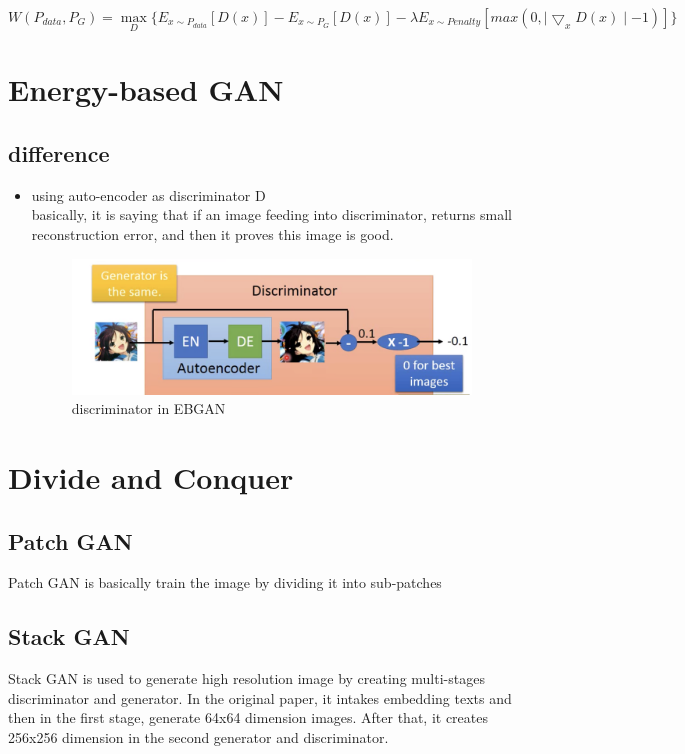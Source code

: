 \documentclass{article}
\begin{document}
\begin{equation}
    W(P_{data}, P_G)=\max_{D} \{ E_{x \sim P_{data}}[D(x)]-E_{x \sim P_{G}}[D(x)]- \lambda E_{x \sim Penalty}[max(0, \mid \bigtriangledown_{x} D(x) \mid -1)] \}
\end{equation}
\section{Energy-based GAN}
\subsection{difference}
\begin{itemize}
\item using auto-encoder as discriminator D\\
basically, it is saying that if an image feeding into discriminator, returns small reconstruction error, and then it proves this image is good.
\begin{figure}
    \centering
    \includegraphics[width=\linewidth]{EBGAN}
    \caption{discriminator in EBGAN}
\end{figure}
\end{itemize}

\section{Divide and Conquer}
\subsection{Patch GAN}
Patch GAN is basically train the image by dividing it into sub-patches
\subsection{Stack GAN}
Stack GAN is used to generate high resolution image by creating multi-stages discriminator and generator. In the original paper, it intakes embedding texts and then in the first stage, generate 64x64 dimension images. After that, it creates 256x256 dimension in the second generator and discriminator.
\end{document}
